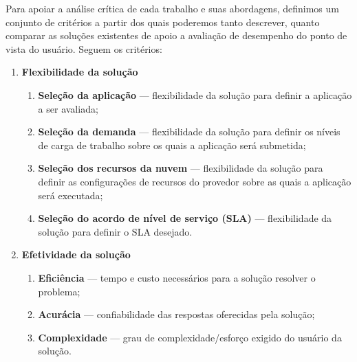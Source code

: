 Para apoiar a análise crítica de cada trabalho e suas abordagens, definimos um conjunto de critérios a partir dos quais poderemos tanto descrever, quanto comparar as soluções existentes de apoio a avaliação de desempenho do ponto de vista do usuário. Seguem os critérios:

\begin{enumerate}
  \item \textbf{Flexibilidade da solução}
  \begin{enumerate}
    \item \textbf{Seleção da aplicação} --- flexibilidade da solução para
    definir a aplicação a ser avaliada;
    \item \textbf{Seleção da demanda} --- flexibilidade da solução para
    definir os níveis de carga de trabalho sobre os quais a aplicação será
    submetida;
	\item \textbf{Seleção dos recursos da nuvem} --- flexibilidade da solução
	para definir as configurações de recursos do provedor sobre as quais a aplicação
	será executada;
	\item \textbf{Seleção do acordo de nível de serviço (SLA)} --- flexibilidade
	da solução para definir o SLA desejado.
  \end{enumerate}
  \item \textbf{Efetividade da solução}  
  \begin{enumerate}
    \item \textbf{Eficiência} --- tempo e custo necessários para a solução
    resolver o problema;
    \item \textbf{Acurácia} --- confiabilidade das respostas oferecidas pela
    solução;
	\item \textbf{Complexidade} --- grau de complexidade/esforço exigido do usuário
	da solução.
  \end{enumerate}
\end{enumerate}


